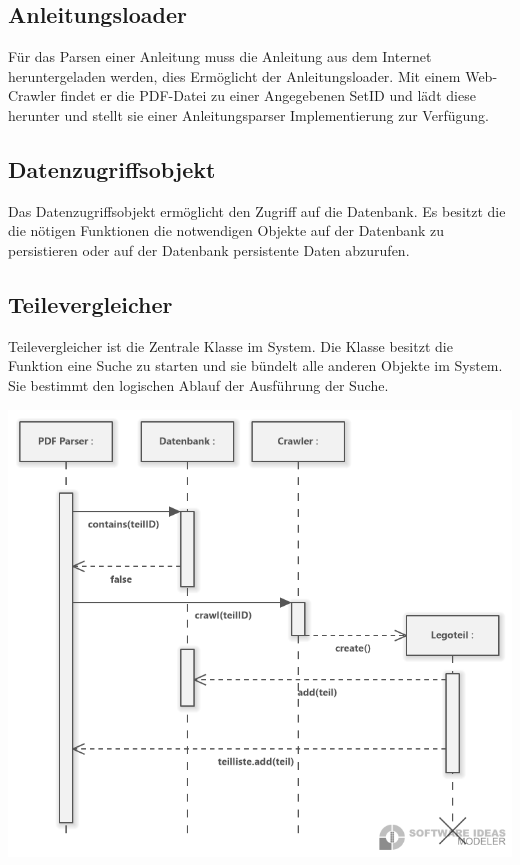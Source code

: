 \subsection{Anleitungsloader}
Für das Parsen einer Anleitung muss die Anleitung aus dem Internet heruntergeladen werden, dies Ermöglicht der Anleitungsloader. Mit einem Web-Crawler findet er die PDF-Datei zu einer Angegebenen SetID und lädt diese herunter und stellt sie einer Anleitungsparser Implementierung zur Verfügung. \newline 
\newline 
\subsection{Datenzugriffsobjekt}
Das Datenzugriffsobjekt ermöglicht den Zugriff auf die Datenbank. Es besitzt die die nötigen Funktionen die notwendigen Objekte auf der Datenbank zu persistieren oder auf der Datenbank persistente Daten abzurufen. \newline 
\newline 
\subsection{Teilevergleicher}
Teilevergleicher ist die Zentrale Klasse im System.  Die Klasse besitzt die Funktion eine Suche zu starten und sie bündelt alle anderen Objekte im System. Sie bestimmt den logischen Ablauf der Ausführung der Suche.\newline 

\includegraphics[width=18cm]{pictures/Anleitungsparser_Sequenzdiagramm.png}

